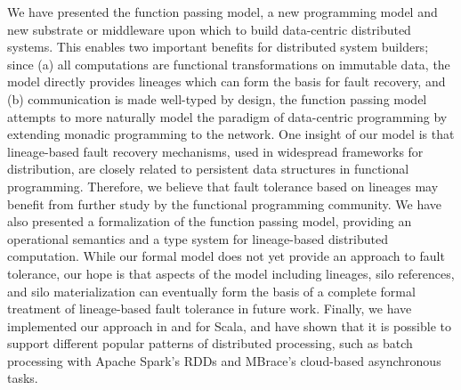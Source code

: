 \documentclass{jfp1}
\begin{document}
We have presented the function passing model, a new programming model and new
substrate or middleware upon which to build data-centric distributed systems.
This enables two important benefits for distributed system builders; since (a)
all computations are functional transformations on immutable data, the model
directly provides lineages which can form the basis for fault recovery, and
(b) communication is made
well-typed by design, the function passing model attempts to more naturally
model the paradigm of data-centric programming by extending monadic programming
to the network. One insight of our model is that lineage-based fault recovery
mechanisms, used in widespread frameworks for distribution, are closely related
to persistent data structures in functional programming. Therefore, we believe
that fault tolerance based on lineages may benefit from further
study by the functional programming community. We have also presented a
formalization of the function passing model, providing an operational
semantics and a type system for lineage-based distributed computation. While
our formal model does not yet provide an approach to fault tolerance,
our hope is that aspects of the model including lineages, silo references, and
silo materialization can eventually form the basis of a complete formal
treatment of lineage-based fault tolerance in future work.
Finally, we have implemented our approach in and for Scala,
and have shown that it is possible to support different popular patterns of
distributed processing, such as  batch processing with Apache Spark's RDDs and
MBrace's cloud-based asynchronous tasks.


%
\end{document}
